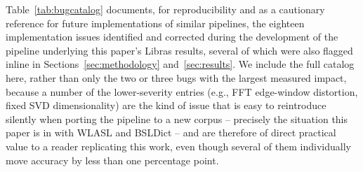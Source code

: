 \documentclass[journal]{IEEEtran}
\begin{document}
Table~\ref{tab:bugcatalog} documents, for reproducibility and as a cautionary reference for future implementations of similar pipelines, the eighteen implementation issues identified and corrected during the development of the pipeline underlying this paper's Libras results, several of which were also flagged inline in Sections~\ref{sec:methodology} and~\ref{sec:results}. We include the full catalog here, rather than only the two or three bugs with the largest measured impact, because a number of the lower-severity entries (e.g., FFT edge-window distortion, fixed SVD dimensionality) are the kind of issue that is easy to reintroduce silently when porting the pipeline to a new corpus -- precisely the situation this paper is in with WLASL and BSLDict -- and are therefore of direct practical value to a reader replicating this work, even though several of them individually move accuracy by less than one percentage point.
\end{document}
